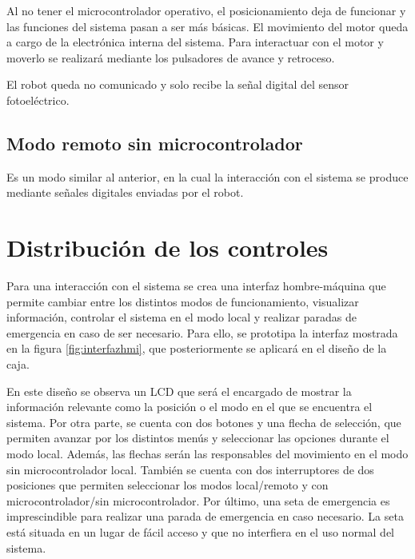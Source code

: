 Al no tener el microcontrolador operativo, el posicionamiento deja de funcionar y las funciones del
sistema pasan a ser más básicas. El movimiento del motor queda a cargo de la electrónica interna del
sistema. Para interactuar con el motor y moverlo se realizará mediante los pulsadores de avance y 
retroceso.

El robot queda no comunicado y solo recibe la señal digital del sensor fotoeléctrico.

\subsection{Modo remoto sin microcontrolador}\label{subsec-04}

Es un modo similar al anterior, en la cual la interacción con el sistema se produce mediante señales
digitales enviadas por el robot.

\section{Distribución de los controles}

Para una interacción con el sistema se crea una interfaz hombre-máquina que permite cambiar entre los
distintos modos de funcionamiento, visualizar información, controlar el sistema en el modo local y realizar
paradas de emergencia en caso de ser necesario. Para ello, se prototipa la interfaz mostrada en la figura 
\ref{fig:interfazhmi}, que posteriormente se aplicará en el diseño de la caja.

En este diseño se observa un LCD que será el encargado de mostrar la información relevante como la posición o
el modo en el que se encuentra el sistema. Por otra parte, se cuenta con dos botones y una flecha de selección,
que permiten avanzar por los distintos menús y seleccionar las opciones durante el modo local. Además, las flechas
serán las responsables del movimiento en el modo sin microcontrolador local. También se cuenta con dos interruptores
de dos posiciones que permiten seleccionar los modos local/remoto y con microcontrolador/sin microcontrolador.
Por último, una seta de emergencia es imprescindible para realizar una parada de emergencia en caso necesario. La 
seta está situada en un lugar de fácil acceso y que no interfiera en el uso normal del sistema.

